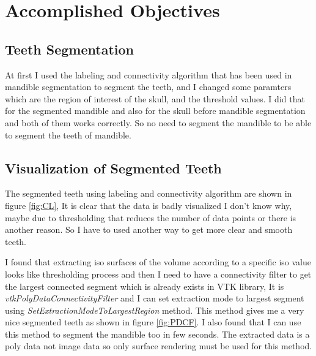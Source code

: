\documentclass[12pt, b5paper]{article}
\begin{document}
\section{Accomplished Objectives}
\subsection{Teeth Segmentation}
At first I used the labeling and connectivity algorithm that has been used in mandible segmentation to segment the teeth, and I changed some paramters which are the region of interest of the skull, and the threshold values. I did that for the segmented mandible and also for the skull before mandible segmentation and both of them works correctly. So no need to segment the mandible to be able to segment the teeth of mandible.

\subsection{Visualization of Segmented Teeth}
The segmented teeth using labeling and connectivity algorithm are shown in figure \ref{fig:CL}, It is clear that the data is badly visualized I don't know why, maybe due to thresholding that reduces the number of data points or there is another reason. So I have to used another way to get more clear and smooth teeth.

\vspace{1cm}
I found that extracting iso surfaces of the volume according to a specific iso value looks like thresholding process and then I need to have a connectivity filter to get the largest connected segment which is already exists in VTK library, It is \textit{vtkPolyDataConnectivityFilter} and I can set extraction mode to largest segment using \textit{SetExtractionModeToLargestRegion} method. This method gives me a very nice segmented teeth as shown in figure \ref{fig:PDCF}. I also found that I can use this method to segment the mandible too in few seconds. The extracted data is a poly data not image data so only surface rendering must be used for this method.
\end{document}
